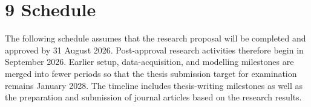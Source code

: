 \clearpage
{}
\section*{9 \textbf{Schedule}}
\label{sec:schedule}

The following schedule assumes that the research proposal will be completed and approved by 31 August 2026. Post-approval research activities therefore begin in September 2026. Earlier setup, data-acquisition, and modelling milestones are merged into fewer periods so that the thesis submission target for examination remains January 2028. The timeline includes thesis-writing milestones as well as the preparation and submission of journal articles based on the research results.


